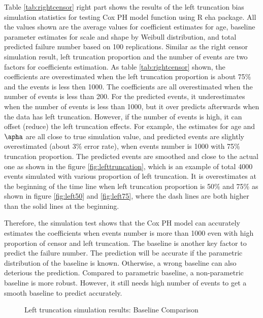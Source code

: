 \documentclass[12pt,letterpaper]{article}
\begin{document}
Table \ref{tab:rightcensor} right part shows the results of the left truncation bias simulation statistics for testing Cox PH model function using R eha package. All the values shown are the average values for coefficient estimates for age, baseline parameter estimates for scale and shape by Weibull distribution, and total predicted failure number based on 100 replications. Similar as the right censor simulation result, left truncation proportion and the number of events are two factors for coefficients estimation. As table \ref{tab:rightcensor} shown, the coefficients are overestimated when the left truncation proportion is about 75\% and the events is less then 1000. The coefficients are all overestimated when the number of events is less than 200. For the predicted events, it underestimates when the number of events is less than 1000, but it over predicts afterwards when the data has left truncation. However, if the number of events is high, it can offset (reduce) the left truncation effects. For example, the estimates for age and $\apha$ are all close to true simulation value, and predicted events are slightly overestimated (about 3\% error rate), when events number is 1000 with 75\% truncation proportion. The predicted events are smoothed and close to the actual one as shown in the figure \ref{fig:lefttruncation}, which is an example of total 4000 events simulated with various proportion of left truncation. It is overestimates at the beginning of the time line when left truncation proportion is 50\% and 75\% as shown in figure \ref{fig:left50} and \ref{fig:left75}, where the dash lines are both higher than the solid lines at the beginning. 

Therefore, the simulation test shows that the Cox PH model can accurately estimates the coefficients when events number is more than 1000 even with high proportion of censor and left truncation. The baseline is another key factor to predict the failure number. The prediction will be accurate if the parametric distribution of the baseline is known. Otherwise, a wrong baseline can also deterious the prediction. Compared to parametric baseline, a non-parametric baseline is more robust. However, it still needs high number of events to get a smooth baseline to predict accurately.  

\begin{figure}[h!]
	\centering
	\quad
	\quad
	\quad
	\caption{Left truncation simulation results: Baseline Comparison}
	\label{fig:baseline}
\end{figure}
\end{document}
